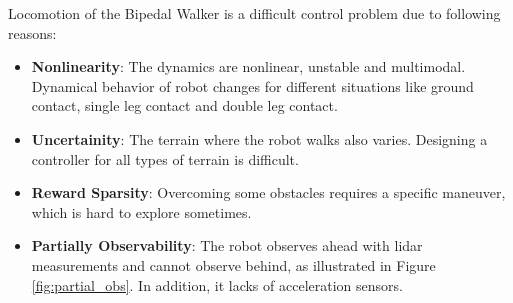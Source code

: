 \documentclass[a4paper, 12pt]{article} %
\begin{document}
Locomotion of the Bipedal Walker is a difficult control problem due to following reasons: 
\begin{itemize}
	\item \textbf{Nonlinearity}: The dynamics are nonlinear, unstable and multimodal. 
	Dynamical behavior of robot changes for different situations 
	like ground contact, single leg contact and double leg contact.
	\item \textbf{Uncertainity}: The terrain where the robot walks also varies. 
	Designing a controller for all types of terrain is difficult.
	\item \textbf{Reward Sparsity}: Overcoming some obstacles requires a specific maneuver, which is hard to explore sometimes.	
	\item \textbf{Partially Observability}: The robot observes 
	ahead with lidar measurements and cannot observe behind, as illustrated in Figure \ref{fig:partial_obs}. 
	In addition, it lacks of acceleration sensors.
\end{itemize}
\end{document}
